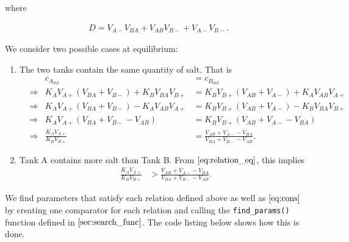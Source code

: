 where

\begin{align}
  D = V_{A-}V_{BA} + V_{AB}V_{B-} + V_{A-}V_{B-}.
\end{align}

We consider two possible cases at equilibrium:

\begin{enumerate}
\def\labelenumi{\arabic{enumi}.}
\tightlist
\item
  The two tanks contain the same quantity of salt. That is \begin{align}
     &&c_{A_{\text{std}}} &= c_{B_{\text{std}}} \\
     &\Rightarrow& K_AV_{A+}(V_{BA}+V_{B-}) + K_BV_{BA}V_{B+} &= K_BV_{B+}(V_{AB}+V_{A-}) + K_AV_{AB}V_{A+} \\
     &\Rightarrow& K_AV_{A+}(V_{BA}+V_{B-}) - K_AV_{AB}V_{A+} &= K_BV_{B+}(V_{AB}+V_{A-}) - K_BV_{BA}V_{B+} \\
     &\Rightarrow& K_AV_{A+}(V_{BA} + V_{B-} - V_{AB}) &= K_BV_{B+}(V_{AB} + V_{A-} - V_{BA}) \\
     &\Rightarrow& \frac{K_AV_{A+}}{K_BV_{B+}} &= \frac{V_{AB} + V_{A-} - V_{BA}}{V_{BA} + V_{B-} - V_{AB}}. \label{eq:relation_eq}
   \end{align}
\item
  Tank A contains more salt than Tank B. From
  \(\autoref{eq:relation_eq}\), this implies \begin{align}
     \frac{K_AV_{A+}}{K_BV_{B+}} &> \frac{V_{AB} + V_{A-} - V_{BA}}{V_{BA} + V_{B-} - V_{AB}}. \label{eq:relation_gt}
   \end{align}
\end{enumerate}

We find parameters that satisfy each relation defined above as well as
\(\autoref{eq:cons}\) by creating one comparator for each relation and
calling the \texttt{find\_params()} function defined in
\(\ref{sec:search_func}\). The code listing below shows how this is
done.

\begin{Shaded}
\begin{Highlighting}[]
 \OperatorTok{=} \NormalTok{(}\OperatorTok{,}\NormalTok{) } \OperatorTok{\textgreater{}} \OperatorTok{;}
 \OperatorTok{=} \NormalTok{(}\OperatorTok{,}\NormalTok{) } \OperatorTok{=} \OperatorTok{;}

 \OperatorTok{=} \NormalTok{(}\NormalTok{)}\OperatorTok{;}
 \OperatorTok{=} \NormalTok{(}\NormalTok{)}\OperatorTok{;}
\end{Highlighting}
\end{Shaded}

